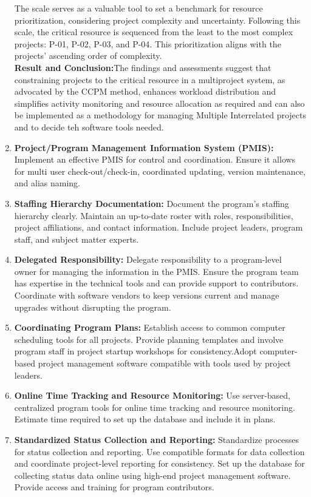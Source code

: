 \documentclass{llncs}
\begin{document}
\begin{enumerate}
\begin{figure}
                    \end{figure}
    The scale serves as a valuable tool to set a benchmark for resource prioritization, considering project complexity and uncertainty. Following this scale, the critical resource is sequenced from the least to the most complex projects: P-01, P-02, P-03, and P-04. This prioritization aligns with the projects' ascending order of complexity.~\cite{refpaper7} \\
    \textbf{Result and Conclusion:}The findings and assessments suggest that constraining projects to the critical resource in a multiproject system, as advocated by the CCPM method, enhances workload distribution and simplifies activity monitoring and resource allocation as required and can also be implemented as a methodology for managing Multiple Interrelated projects and to decide teh software tools needed.~\cite{refpaper7}
    \item\textbf{Project/Program Management Information System (PMIS):}
    Implement an effective PMIS for control and coordination.
    Ensure it allows for multi user check-out/check-in, coordinated updating, version maintenance, and alias naming.
    \item\textbf{Staffing Hierarchy Documentation:}
    Document the program’s staffing hierarchy clearly.
    Maintain an up-to-date roster with roles, responsibilities, project affiliations, and contact information.
    Include project leaders, program staff, and subject matter experts.
    \item \textbf{Delegated Responsibility:}
    Delegate responsibility to a program-level owner for managing the information in the PMIS. Ensure the program team has expertise in the technical tools and can provide support to contributors.
    Coordinate with software vendors to keep versions current and manage upgrades without disrupting the program.
    \item \textbf{Coordinating Program Plans:}
    Establish access to common computer scheduling tools for all projects.
    Provide planning templates and involve program staff in project startup workshops for consistency.Adopt computer-based project management software compatible with tools used by project leaders.
    \item \textbf{Online Time Tracking and Resource Monitoring:}
    Use server-based, centralized program tools for online time tracking and resource monitoring.
    Estimate time required to set up the database and include it in plans.
    \item \textbf{Standardized Status Collection and Reporting:}
    Standardize processes for status collection and reporting.
    Use compatible formats for data collection and coordinate project-level reporting for consistency.
    Set up the database for collecting status data online using high-end project management software.
    Provide access and training for program contributors.
\end{enumerate}
\end{document}
